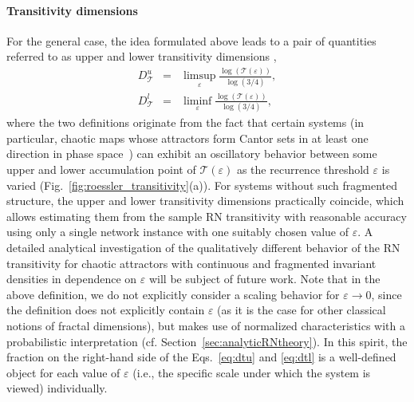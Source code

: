 		\paragraph{Transitivity dimensions}
		For the general case, the idea formulated above leads to a pair of quantities referred to as upper and lower transitivity dimensions \cite{Donner2011b},
\begin{eqnarray}
D_{\mathcal{T}}^u &=& \limsup_{\varepsilon} \frac{\log(\mathcal{T}(\varepsilon))}{\log(3/4)}, \label{eq:dtu} \\
D_{\mathcal{T}}^l &=& \liminf_{\varepsilon} \frac{\log(\mathcal{T}(\varepsilon))}{\log(3/4)}, \label{eq:dtl}
\end{eqnarray}
\noindent
where the two definitions originate from the fact that certain systems (in particular, chaotic maps whose attractors form Cantor sets in at least one direction in phase space~\cite{Donner2011b}) can exhibit an oscillatory behavior between some upper and lower accumulation point of $\mathcal{T}(\varepsilon)$ as the recurrence threshold $\varepsilon$ is varied (Fig.~\ref{fig:roessler_transitivity}(a)). For systems without such fragmented structure, the upper and lower transitivity dimensions practically coincide, which allows estimating them from the sample RN transitivity with reasonable accuracy using only a single network instance with one suitably chosen value of $\varepsilon$. A detailed analytical investigation of the qualitatively different behavior of the RN transitivity for chaotic attractors with continuous and fragmented invariant densities in dependence on $\varepsilon$ will be subject of future work. Note that in the above definition, we do not explicitly consider a scaling behavior for $\varepsilon\to 0$, since the definition does not explicitly contain $\varepsilon$ (as it is the case for other classical notions of fractal dimensions), but makes use of normalized characteristics with a probabilistic interpretation (cf. Section~\ref{sec:analyticRNtheory}). In this spirit, the fraction on the right-hand side of the Eqs.~\eqref{eq:dtu} and \eqref{eq:dtl} is a well-defined object for each value of $\varepsilon$ (i.e., the specific scale under which the system is viewed) individually.
